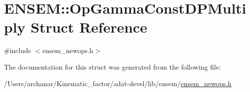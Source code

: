 \hypertarget{structENSEM_1_1OpGammaConstDPMultiply}{}\section{E\+N\+S\+EM\+:\+:Op\+Gamma\+Const\+D\+P\+Multiply Struct Reference}
\label{structENSEM_1_1OpGammaConstDPMultiply}


{\ttfamily \#include $<$ensem\+\_\+newops.\+h$>$}



The documentation for this struct was generated from the following file\+:\begin{DoxyCompactItemize}
\item 
/\+Users/archanar/\+Kinematic\+\_\+factor/adat-\/devel/lib/ensem/\mbox{\hyperlink{adat-devel_2lib_2ensem_2ensem__newops_8h}{ensem\+\_\+newops.\+h}}\end{DoxyCompactItemize}
